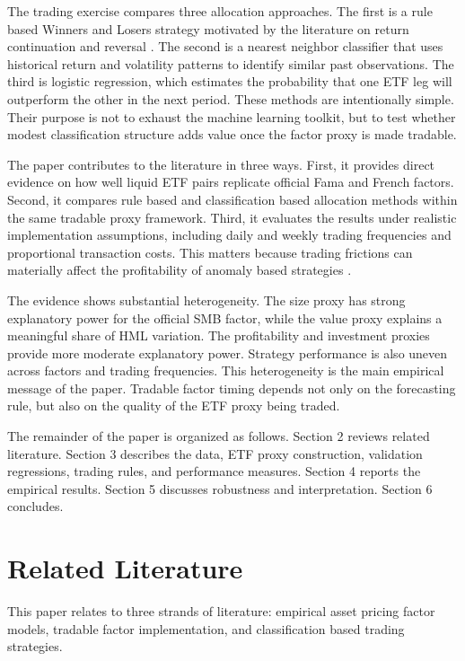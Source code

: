 \documentclass[investment,article,submit,pdftex,moreauthors]{Definitions/mdpi}
\begin{document}
The trading exercise compares three allocation approaches. The first is a rule based Winners and Losers strategy motivated by the literature on return continuation and reversal \citep{debondt1985overreact,jegadeesh1993returns}. The second is a nearest neighbor classifier that uses historical return and volatility patterns to identify similar past observations. The third is logistic regression, which estimates the probability that one ETF leg will outperform the other in the next period. These methods are intentionally simple. Their purpose is not to exhaust the machine learning toolkit, but to test whether modest classification structure adds value once the factor proxy is made tradable.

The paper contributes to the literature in three ways. First, it provides direct evidence on how well liquid ETF pairs replicate official Fama and French factors. Second, it compares rule based and classification based allocation methods within the same tradable proxy framework. Third, it evaluates the results under realistic implementation assumptions, including daily and weekly trading frequencies and proportional transaction costs. This matters because trading frictions can materially affect the profitability of anomaly based strategies \citep{frazzini2014trading}.

The evidence shows substantial heterogeneity. The size proxy has strong explanatory power for the official SMB factor, while the value proxy explains a meaningful share of HML variation. The profitability and investment proxies provide more moderate explanatory power. Strategy performance is also uneven across factors and trading frequencies. This heterogeneity is the main empirical message of the paper. Tradable factor timing depends not only on the forecasting rule, but also on the quality of the ETF proxy being traded.

The remainder of the paper is organized as follows. Section 2 reviews related literature. Section 3 describes the data, ETF proxy construction, validation regressions, trading rules, and performance measures. Section 4 reports the empirical results. Section 5 discusses robustness and interpretation. Section 6 concludes.

\section{Related Literature}

This paper relates to three strands of literature: empirical asset pricing factor models, tradable factor implementation, and classification based trading strategies.
\end{document}
